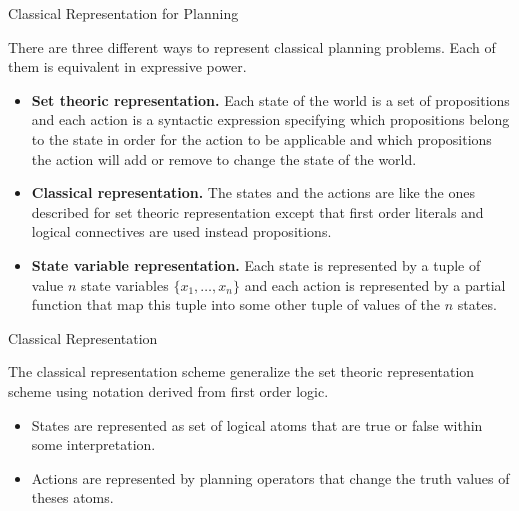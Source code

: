 \documentclass[9pt]{beamer}
\begin{document}
\begin{frame}{Classical Representation for Planning}
\begin{small}

There are three different ways to represent classical planning problems. Each of them is equivalent in expressive power.

\begin{itemize}
\item \textbf{Set theoric representation.} Each state of the world is a set of propositions and each action is a syntactic expression specifying which propositions belong to the state in order for the action to be applicable and which propositions the action will add or remove to change the state of the world.
\item \textbf{Classical representation.} The states and the actions are like the ones described for set theoric representation except that first order literals and logical connectives are used instead propositions.
\item \textbf{State variable representation.} Each state is represented by a tuple of value $n$ state variables $\{x_1, \dots, x_n\}$ and each action is represented by a partial function that map this tuple into some other tuple of values of the $n$ states.
\end{itemize}
\end{small}
\end{frame}

\begin{frame}{Classical Representation}
\begin{small}
The classical representation scheme generalize the set theoric representation scheme using notation derived from first order logic.
\begin{itemize}
\item \textcolor{CS-1light}{States} are represented as set of logical atoms that are true or false within some interpretation.
\item \textcolor{CS-1light}{Actions} are represented by planning operators that change the truth values of theses atoms.
\end{itemize}
\end{small}
\end{frame}
\end{document}

